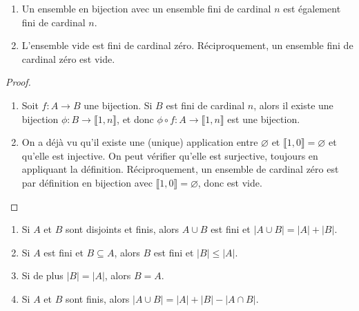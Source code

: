 \begin{proposition}
\begin{enumerate}
\item Un ensemble en bijection avec un ensemble fini de cardinal $n$ est également fini de cardinal $n$.
\item L'ensemble vide est fini de cardinal zéro. Réciproquement, un ensemble fini de cardinal zéro est vide.
\end{enumerate}
\end{proposition}
\begin{proof}
\begin{enumerate}
\item Soit $f:A\to B$ une bijection. Si $B$ est fini de cardinal $n$, alors il existe une bijection $\phi : B\to \llbracket 1,n\rrbracket$, et donc  $\phi\circ f : A\to \llbracket 1,n\rrbracket$ est une bijection.
\item On a déjà vu qu'il existe une (unique) application entre $\varnothing$ et $\llbracket 1,0\rrbracket=\varnothing$ et qu'elle est injective. On peut vérifier qu'elle est surjective, toujours en appliquant la définition. Réciproquement, un ensemble de cardinal zéro est par définition en bijection avec $\llbracket 1,0\rrbracket = \varnothing$, donc est vide.
\end{enumerate}
\end{proof}

\begin{proposition}
\begin{enumerate}
\item Si $A$ et $B$ sont disjoints et finis, alors $A\cup B$ est fini et $|A\cup B|=|A|+|B|$.
\item  Si $A$ est fini et $B \subseteq A$, alors $B$ est fini et $|B| \leq |A|$.
\item Si de plus $|B| = |A|$, alors $B=A$.
\item Si $A$ et $B$ sont finis, alors $|A\cup B| = |A| + |B| - |A\cap B|$.
\end{enumerate}
\end{proposition}

